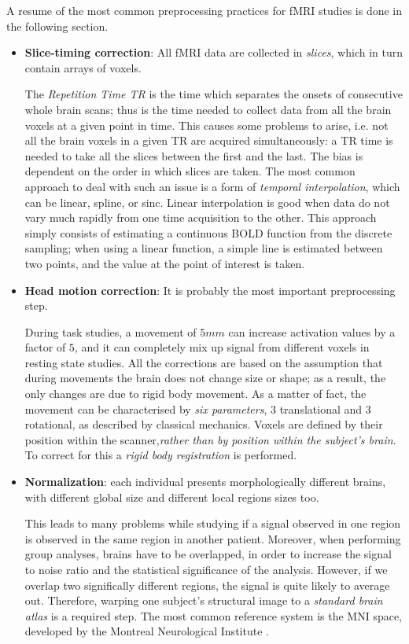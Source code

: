 \documentclass[12pt,openright,twoside,a4paper]{book}
\begin{document}
A resume of the most common preprocessing practices for fMRI studies is done in the following section.

\begin{itemize}
\item \textbf{Slice-timing correction}: All fMRI data are collected in \textit{slices}, which in turn contain arrays of voxels. 

The \textit{Repetition Time TR} is the time which separates the onsets of consecutive whole brain scans; thus is the time needed to collect data from all the brain voxels at a given point in time. 
This causes some problems to arise, i.e. not all the brain voxels in a given TR are acquired simultaneously: a TR time is needed to take all the slices between the first and the last. 
The bias is dependent on the order in which slices are taken. 
The most common approach to deal with such an issue is a form of \textit{temporal interpolation}, which can be linear, spline, or sinc. 
Linear interpolation is good when data do not vary much rapidly from one time acquisition to the other. This approach simply consists of estimating a continuous BOLD function from the discrete sampling; when using a linear function, a simple line is estimated between
two points, and the value at the point of interest is taken.

\item \textbf{Head motion correction}: It is probably the most important preprocessing step.

During task studies,  a movement of $5mm$ can increase activation values by a factor of $5$, and it can completely mix up signal from different voxels in resting state studies.
All the corrections are based on the assumption that during movements the brain does not change size or shape; as a result, the only changes are due to rigid body movement. 
 As a matter of fact, the movement can be characterised by \textit{six parameters}, 3 translational and 3 rotational, as described by classical mechanics. 
 Voxels are defined by their position within the scanner,\textit{rather than by position within the subject’s brain}. 
To correct for this a \textit{rigid body registration} is performed.

\item \textbf{Normalization}: each individual presents morphologically different brains, with different global size and different local regions sizes  too. 

This leads to many problems while studying if a signal observed in one region is observed in the same region in another patient. 
Moreover, when performing group analyses, brains have to be overlapped, in order to increase the signal to noise ratio and the statistical significance of the analysis. 
However, if we overlap two significally different regions, the signal is quite likely to average out. 
Therefore, warping one subject’s structural image to a \textit{standard brain atlas} is a required step.
The most common reference system is the MNI space, developed by the Montreal Neurological Institute \cite{atlas}.


\end{itemize}
\end{document}
